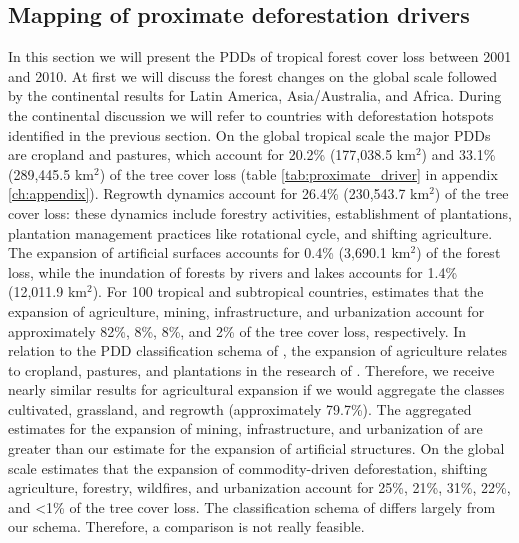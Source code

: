 		\subsection{Mapping of proximate deforestation drivers}
		\label{subsec:results_proxy_deforestation_drivers}
			In this section we will present the \acp{PDD} of tropical forest cover loss between 2001 and 2010. At first we will discuss the forest changes on the global scale followed by the continental results for Latin America, Asia/Australia, and Africa. During the continental discussion we will refer to countries with deforestation hotspots identified in the previous section. On the global tropical scale the major \acp{PDD} are cropland and pastures, which account for 20.2\% (177,038.5 km$^2$) and 33.1\% (289,445.5 km$^2$) of the tree cover loss (table \ref{tab:proximate_driver} in appendix \ref{ch:appendix}). Regrowth dynamics account for 26.4\% (230,543.7 km$^2$) of the tree cover loss: these dynamics include forestry activities, establishment of plantations, plantation management practices like rotational cycle, and shifting agriculture. The expansion of artificial surfaces accounts for 0.4\% (3,690.1 km$^2$) of the forest loss, while the inundation of forests by rivers and lakes accounts for 1.4\% (12,011.9 km$^2$). For 100 tropical and subtropical countries, \citet{Hosonuma2012} estimates that the expansion of agriculture, mining, infrastructure, and urbanization account for approximately 82\%, 8\%, 8\%, and 2\% of the tree cover loss, respectively. In relation to the \ac{PDD} classification schema of \citet{Geist2001}, the expansion of agriculture relates to cropland, pastures, and plantations in the research of \citet{Hosonuma2012}. Therefore, we receive nearly similar results for agricultural expansion if we would aggregate the classes cultivated, grassland, and regrowth (approximately 79.7\%). The aggregated estimates for the expansion of mining, infrastructure, and urbanization of \citet{Hosonuma2012} are greater than our estimate for the expansion of artificial structures. On the global scale \citet{Curtis2018} estimates that the expansion of commodity-driven deforestation, shifting agriculture, forestry, wildfires, and urbanization account for 25\%, 21\%, 31\%, 22\%, and <1\% of the tree cover loss. The classification schema of \citet{Curtis2018} differs largely from our schema. Therefore, a comparison is not really feasible. 

